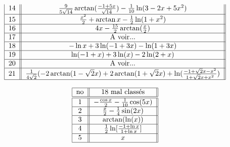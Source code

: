 \[\begin{tabular}{| c || c ||  }
              $14$  &  $\frac{9}{5\sqrt{14}}\arctan(\frac{-1+5x}{\sqrt{14}})-\frac{1}{10}\ln(3-2x+5x^2)$			                                                               \\ \hline   
              $15$  &  $\frac{x^2}{2}+\arctan x-\frac{1}{2}\ln(1+x^2)$			                                                               \\ \hline   
              $16$  &  $4x-\frac{15}{2}\arctan(\frac{x}{2})$			                                                               \\ \hline   
              $17$  & A voir...		                                                               \\ \hline   
              $18$  &  $-\ln x +3\ln(-1+3x)-\ln(1+3x)$			                                                               \\ \hline   
              $19$  &  $\ln(-1+ x) +3\ln(x)-2\ln(2+x)$			                                                               \\ \hline   
              $20$  & A voir...	                                                               \\ \hline   
              $21$  &  $\frac{1}{4\sqrt2}(-2\arctan(1-\sqrt2 x)+2\arctan(1+\sqrt2x)+\ln(\frac{-1+\sqrt2x-x^2}{1+\sqrt2x+x^2})$			                                                               \\ \hline   
\end{tabular} \]


\[ \begin{tabular}{| c || c ||  }
\hline       no &         ${ 18}                              $       mal classés                                                                                                        \\    \hline \hline
             $1$   & $-\frac{\cos x}{2}-\frac{1}{10}\cos(5x)      $            \\ \hline 
            $2$   &  $ \frac{x}{2}-\frac{1}{4}\sin(2x)$                 \\ \hline

           $3$   &      $  \arctan(\ln(x)) $ 						\\ \hline 
           $4$   &      $   \frac{1}{2}\ln[\frac{-1+\ln x}{1+\ln x}]            $                                                 				\\ \hline 
           $5$	  &      $x$                                                       \\ \hline   
\end{tabular} \]





